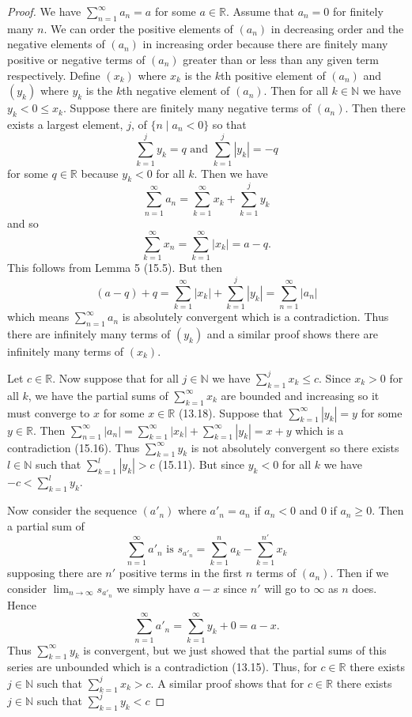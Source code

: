 \documentclass{article}
\begin{document}
\begin{flushleft}
\begin{proof}
We have $\sum_{n=1}^{\infty} a_n = a$ for some $a \in \mathbb{R}$. Assume that $a_n = 0$ for finitely many $n$. We can order the positive elements of $(a_n)$ in decreasing order and the negative elements of $(a_n)$ in increasing order because there are finitely many positive or negative terms of $(a_n)$ greater than or less than any given term respectively. Define $(x_k)$ where $x_k$ is the $k$th positive element of $(a_n)$ and $(y_k)$ where $y_k$ is the $k$th negative element of $(a_n)$. Then for all $k \in \mathbb{N}$ we have $y_k < 0 \leq x_k$. Suppose there are finitely many negative terms of $(a_n)$. Then there exists a largest element, $j$, of $\{n \mid a_n < 0\}$ so that
\[
\sum_{k=1}^{j} y_k = q \text{ and } \sum_{k=1}^{j} |y_k| = -q
\]
for some $q \in \mathbb{R}$ because $y_k < 0$ for all $k$. Then we have
\[
\sum_{n=1}^{\infty} a_n = \sum_{k=1}^{\infty} x_k + \sum_{k=1}^{j} y_k
\]
and so
\[
\sum_{k=1}^{\infty} x_n = \sum_{k=1}^{\infty} |x_k| = a-q.
\]
This follows from Lemma 5 (15.5). But then
\[
(a-q)+q = \sum_{k=1}^{\infty} |x_k| + \sum_{k=1}^{j} |y_k| = \sum_{n=1}^{\infty} |a_n|
\]
which means $\sum_{n=1}^{\infty} a_n$ is absolutely convergent which is a contradiction. Thus there are infinitely many terms of $(y_k)$ and a similar proof shows there are infinitely many terms of $(x_k)$.\newline

Let $c \in \mathbb{R}$. Now suppose that for all $j \in \mathbb{N}$ we have $\sum_{k=1}^{j} x_k \leq c$. Since $x_k > 0$ for all $k$, we have the partial sums of $\sum_{k=1}^{\infty} x_k$ are bounded and increasing so it must converge to $x$ for some $x \in \mathbb{R}$ (13.18). Suppose that $\sum_{k=1}^{\infty} |y_k| = y$ for some $y \in \mathbb{R}$. Then $\sum_{n=1}^{\infty} |a_n| = \sum_{k=1}^{\infty} |x_k| + \sum_{k=1}^{\infty} |y_k| = x+y$ which is a contradiction (15.16). Thus $\sum_{k=1}^{\infty} y_k$ is not absolutely convergent so there exists $l \in \mathbb{N}$ such that $\sum_{k=1}^{l} |y_k| > c$ (15.11). But since $y_k < 0$ for all $k$ we have $-c < \sum_{k=1}^{l} y_k$.\newline

Now consider the sequence $(a'_n)$ where $a'_n = a_n$ if $a_n < 0$ and $0$ if $a_n \geq 0$. Then a partial sum of
\[
\sum_{n=1}^{\infty} a'_n \text{ is } s_{a'_n} = \sum_{k=1}^{n} a_k - \sum_{k=1}^{n'} x_k
\]
supposing there are $n'$ positive terms in the first $n$ terms of $(a_n)$. Then if we consider $\lim_{n \rightarrow \infty} s_{a'_n}$ we simply have $a-x$ since $n'$ will go to $\infty$ as $n$ does. Hence
\[
\sum_{n=1}^{\infty} a'_n = \sum_{k=1}^{\infty} y_k + 0 = a-x.
\]
Thus $\sum_{k=1}^{\infty} y_k$ is convergent, but we just showed that the partial sums of this series are unbounded which is a contradiction (13.15). Thus, for $c \in \mathbb{R}$ there exists $j \in \mathbb{N}$ such that $\sum_{k=1}^{j} x_k > c$. A similar proof shows that for $c \in \mathbb{R}$ there exists $j \in \mathbb{N}$ such that $\sum_{k=1}^{j} y_k < c$\newline


\end{proof}
\end{flushleft}
\end{document}
